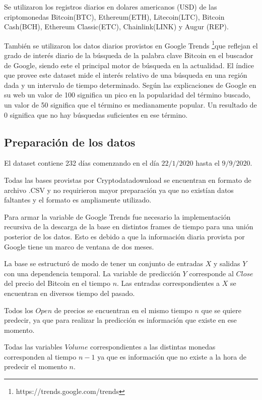 \documentclass[a4paper,12pt,twocolumn]{article}
\begin{document}
Se utilizaron los registros diarios en dolares americanos (USD)  de las criptomonedas Bitcoin(BTC), Ethereum(ETH), Litecoin(LTC), Bitcoin Cash(BCH), Ethereum Classic(ETC), Chainlink(LINK) y  Augur (REP). 
 

También se utilizaron los datos diarios provistos en Google Trends \footnote{https://trends.google.com/trends }que reflejan el grado de interés diario de la búsqueda de la palabra clave Bitcoin en el buscador de Google, siendo este el principal motor de búsqueda en la actualidad. El índice que provee este dataset mide el interés relativo de una búsqueda en una región dada y un intervalo de tiempo determinado. Según las explicaciones de Google en su web un valor de 100 significa un pico en la popularidad del término buscado, un valor de 50 significa que el término es medianamente popular. Un resultado de 0 significa que no hay búsquedas suficientes en ese término. 

\subsection{Preparación de los datos}

El dataset contiene 232 días comenzando en el día $22/1/2020$  hasta el $9/9/2020$. 

Todas las bases provistas por Cryptodatadownload se encuentran en formato de archivo .CSV y no requirieron mayor preparación ya que no existían datos faltantes y el formato es ampliamente utilizado. 

Para armar la variable de Google Trends fue necesario la implementación recursiva de la descarga de la base en distintos frames de tiempo para una unión posterior  de los datos. Esto es debido a que la información diaria provista por Google tiene un marco de ventana de dos meses. 

La base se estructuró de modo de tener un conjunto de entradas $X$ y salidas $Y$ con una dependencia temporal. La variable de predicción $Y$ corresponde al $Close$ del precio del Bitcoin en el tiempo $n$. Las entradas correspondientes a $X$ se encuentran en diversos tiempo del pasado. 

Todos los $Open$ de precios se encuentran en el mismo tiempo $n$ que se quiere predecir, ya que para realizar la predicción es información que existe en ese momento. 

Todas las variables $Volume$ correspondientes a las distintas monedas corresponden al tiempo $n-1$ ya que es información que no existe a la hora de predecir el momento $n$.
\end{document}
